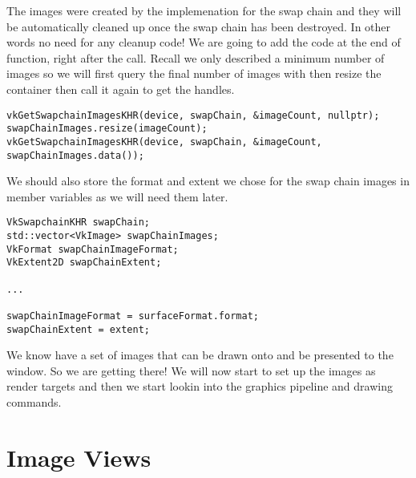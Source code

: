\par The images were created by the implemenation for the swap chain and they will be automatically cleaned up once the swap chain has been destroyed. In other words no need for any cleanup code! We are going to add the code at the end of  function, right after the  call. Recall we only described a minimum number of images so we will first query the final number of images with  then resize the container then call it again to get the handles.

\begin{center}
\begin{minipage}{0.95\linewidth}
\begin{lstlisting}
vkGetSwapchainImagesKHR(device, swapChain, &imageCount, nullptr);
swapChainImages.resize(imageCount);
vkGetSwapchainImagesKHR(device, swapChain, &imageCount, swapChainImages.data());
\end{lstlisting}
\end{minipage}
\end{center}

\par We should also store the format and extent we chose for the swap chain images in member variables as we will need them later.

\begin{center}
\begin{minipage}{0.95\linewidth}
\begin{lstlisting}
VkSwapchainKHR swapChain;
std::vector<VkImage> swapChainImages;
VkFormat swapChainImageFormat;
VkExtent2D swapChainExtent;

...

swapChainImageFormat = surfaceFormat.format;
swapChainExtent = extent;
\end{lstlisting}
\end{minipage}
\end{center}

\par We know have a set of images that can be drawn onto and be presented to the window. So we are getting there! We will now start to set up the images as render targets and then we start lookin into the graphics pipeline and drawing commands.

\section*{Image Views}

